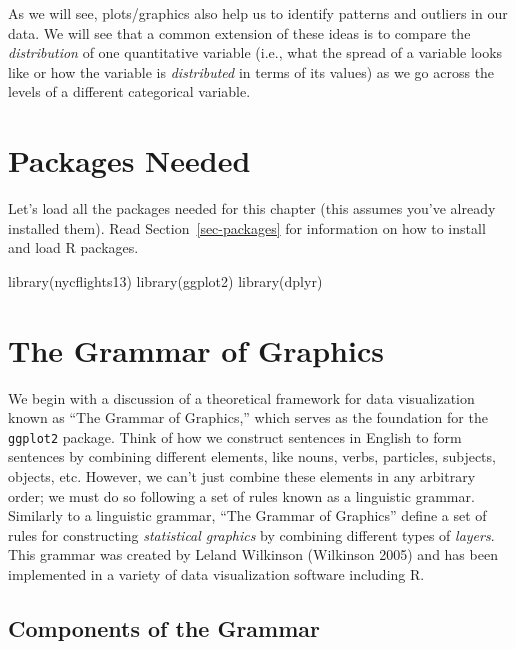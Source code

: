\documentclass[
  letterpaper,
  DIV=11,
  numbers=noendperiod]{scrreprt}
\newenvironment{Shaded}{\begin{snugshade}}{\end{snugshade}}
\newcommand{\FunctionTok}[1]{\textcolor[rgb]{0.28,0.35,0.67}{#1}}
\newcommand{\NormalTok}[1]{\textcolor[rgb]{0.00,0.23,0.31}{#1}}
\theoremstyle{definition}
\theoremstyle{remark}
\begin{document}
As we will see, plots/graphics also help us to identify patterns and
outliers in our data. We will see that a common extension of these ideas
is to compare the \emph{distribution} of one quantitative variable
(i.e., what the spread of a variable looks like or how the variable is
\emph{distributed} in terms of its values) as we go across the levels of
a different categorical variable.

\hypertarget{packages-needed}{%
\section*{Packages Needed}\label{packages-needed}}

Let's load all the packages needed for this chapter (this assumes you've
already installed them). Read Section~\ref{sec-packages} for information
on how to install and load R packages.

\begin{Shaded}
\begin{Highlighting}[]
\FunctionTok{library}\NormalTok{(nycflights13)}
\FunctionTok{library}\NormalTok{(ggplot2)}
\FunctionTok{library}\NormalTok{(dplyr)}
\end{Highlighting}
\end{Shaded}

\hypertarget{sec-grammarofgraphics}{%
\section{The Grammar of Graphics}\label{sec-grammarofgraphics}}

We begin with a discussion of a theoretical framework for data
visualization known as ``The Grammar of Graphics,'' which serves as the
foundation for the \texttt{ggplot2} package. Think of how we construct
sentences in English to form sentences by combining different elements,
like nouns, verbs, particles, subjects, objects, etc. However, we can't
just combine these elements in any arbitrary order; we must do so
following a set of rules known as a linguistic grammar. Similarly to a
linguistic grammar, ``The Grammar of Graphics'' define a set of rules
for constructing \emph{statistical graphics} by combining different
types of \emph{layers}. This grammar was created by Leland Wilkinson
(Wilkinson 2005) and has been implemented in a variety of data
visualization software including R.

\hypertarget{components-of-the-grammar}{%
\subsection{Components of the Grammar}\label{components-of-the-grammar}}
\end{document}
